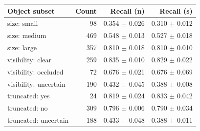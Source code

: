 \begin{tabular}{lrrr}
\toprule
Object subset & Count & Recall (n) & Recall (s) \\
\midrule
size: small & 98 & 0.354 $\pm$ 0.026 & 0.310 $\pm$ 0.012 \\
size: medium & 469 & 0.548 $\pm$ 0.013 & 0.527 $\pm$ 0.018 \\
size: large & 357 & 0.810 $\pm$ 0.018 & 0.810 $\pm$ 0.010 \\
visibility: clear & 259 & 0.835 $\pm$ 0.010 & 0.829 $\pm$ 0.022 \\
visibility: occluded & 72 & 0.676 $\pm$ 0.021 & 0.676 $\pm$ 0.069 \\
visibility: uncertain & 190 & 0.432 $\pm$ 0.045 & 0.388 $\pm$ 0.008 \\
truncated: yes & 24 & 0.819 $\pm$ 0.024 & 0.833 $\pm$ 0.042 \\
truncated: no & 309 & 0.796 $\pm$ 0.006 & 0.790 $\pm$ 0.034 \\
truncated: uncertain & 188 & 0.433 $\pm$ 0.048 & 0.388 $\pm$ 0.011 \\
\bottomrule
\end{tabular}
